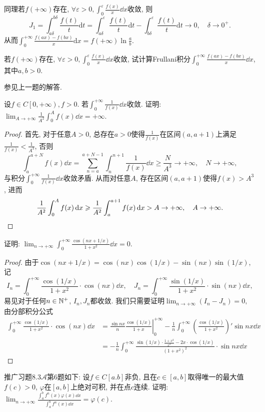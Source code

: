 \begin{quiza}
\begin{solution}
同理若\(f(+\infty)\)存在, \(\forall\varepsilon>0,\int_{0}^{\varepsilon}\frac{f(x)}{x}\dd x\)收敛, 则\[J_1=\int_{a\delta}^{b\delta}\frac{f(t)}{t}\mathrm{d}t=\int_{a\delta}^{\varepsilon}\frac{f(t)}{t}\mathrm{d}t-\int_{b\delta}^{\varepsilon}\frac{f(t)}{t}\mathrm{d}t\rightarrow0,\quad\delta\rightarrow 0^+.\]从而\(\int_0^{+\infty}\frac{f(ax)-f(bx)}{x}\mathrm{d}x=f(+\infty)\ln\frac{a}{b}.\)
\end{solution}
\woe 若\(f(+\infty)\)存在, \(\forall\varepsilon>0,\int_{0}^{\varepsilon}\frac{f(x)}{x}\dd x\)收敛, 试计算Frullani积分\(\int_{0}^{+\infty}\frac{f(ax)-f(bx)}{x}\dd x\), 其中\(a,b>0\).
\begin{solution}
参见上一题的解答.
\end{solution}
\woe 设\(f\in C\left[0,+\infty\right),f>0\). 若\(\int_{0}^{+\infty}\frac{1}{f(x)}\dd x\)收敛. 证明: \(\lim_{A\rightarrow+\infty}\frac{1}{A^2}\int_{0}^{A}f(x)\dd x=+\infty\).
\begin{proof}
首先, 对于任意\(A>0\), 总存在\(a>0\)使得\(\frac{1}{f(x)}\)在区间\((a,a+1)\)上满足\(\frac{1}{f(x)}<\frac{1}{A^3}\), 否则\[\int_{a}^{a+N}f(x)\dd x=\sum_{n=a}^{a+N-1}\int_{n}^{n+1}\frac{1}{f(x)}\dd x\geqslant \frac{N}{A^3}\rightarrow+\infty,\quad N\rightarrow+\infty,\]与积分\(\int_{0}^{+\infty}\frac{1}{f(x)}\dd x\)收敛矛盾. 从而对任意\(A\), 存在区间\((a,a+1)\)使得\(f(x)>A^3\), 进而\[\frac{1}{A^2}\int_{0}^{A}f(x)\,\mathrm{d} x\geqslant\frac{1}{A^2}\int_{a}^{a+1}f(x)\,\mathrm{d} x> A\rightarrow+\infty,\quad A\rightarrow+\infty.\qedhere\]
\end{proof}
\woe 证明: \(\lim_{n\rightarrow+\infty}\int_{0}^{+\infty}\frac{\cos\left(nx+1/x\right)}{1+x^2}\dd x=0\).
\begin{proof}
由于\(\cos\left(nx+1/x\right)=\cos(nx)\cos\left(1/x\right)-\sin(nx)\sin(1/x)\), 记\[I_n=\int_{0}^{+\infty}\frac{\cos(1/x)}{1+x^2}\cdot\cos(nx)\dd x,\quad J_n=\int_{0}^{+\infty}\frac{\sin(1/x)}{1+x^2}\cdot\sin(nx)\dd x,\]易见对于任何\(n\in\mathbb{N}^+\), \(I_n,J_n\)都收敛. 我们只需要证明\(\lim_{n\rightarrow+\infty}\left(I_n-J_n\right)=0,\) 由分部积分公式\[\begin{split}
\int_{0}^{+\infty}\frac{\cos(1/x)}{1+x^2}\cdot\cos(nx)\dd x&=\left.\frac{\sin nx}{n}\frac{\cos(1/x)}{1+x}\right|_0^{+\infty}-\frac{1}{n}\int_{0}^{+\infty}\left(\frac{\cos(1/x)}{1+x^2}\right)'\sin nx\dd x\\&=-\frac{1}{n}\int_{0}^{+\infty}\frac{\sin(1/x)\cdot\frac{1+x^2}{x^2}-2x\cdot\cos(1/x)}{(1+x^2)^2}\cdot\sin nx\dd x
\end{split}\]
\end{proof}
\woe 推广习题8.3\(\boldsymbol{\mathcal{A}}\)第6题如下: 设\(f\in C[a.b]\)非负, 且在\(c\in[a,b]\)取得唯一的最大值\(f(c)>0\), \(\varphi\)在\([a,b]\)上绝对可积, 并在点\(c\)连续. 证明: \(\lim_{n\rightarrow+\infty}\frac{\displaystyle\int_{a}^{b}f^n(x)\varphi(x)\dd x}{\displaystyle\int_{a}^{b}f^n(x)\dd x}=\varphi(c)\).
\end{quiza}
